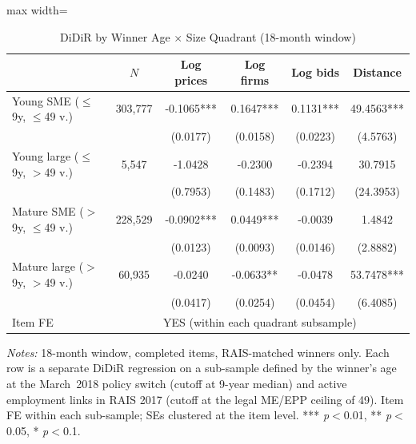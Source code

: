 \begin{table}[htbp]
\centering
\caption{DiDiR by Winner Age $\times$ Size Quadrant (18-month window)}
\label{tab:age_size}
\begin{adjustbox}{max width=\textwidth}
\begin{threeparttable}
\small
\begin{tabular}{lccccc}
\toprule
 & $N$ & Log prices & Log firms & Log bids & Distance \\
\midrule
Young SME ($\leq$9y, $\leq$49 v.) & 303,777 & -0.1065*** & 0.1647*** & 0.1131*** & 49.4563*** \\
 & & (0.0177) & (0.0158) & (0.0223) & (4.5763) \\
Young large ($\leq$9y, $>$49 v.) & 5,547 & -1.0428 & -0.2300 & -0.2394 & 30.7915 \\
 & & (0.7953) & (0.1483) & (0.1712) & (24.3953) \\
Mature SME ($>$9y, $\leq$49 v.) & 228,529 & -0.0902*** & 0.0449*** & -0.0039 & 1.4842 \\
 & & (0.0123) & (0.0093) & (0.0146) & (2.8882) \\
Mature large ($>$9y, $>$49 v.) & 60,935 & -0.0240 & -0.0633** & -0.0478 & 53.7478*** \\
 & & (0.0417) & (0.0254) & (0.0454) & (6.4085) \\
\midrule
Item FE & \multicolumn{5}{c}{YES (within each quadrant subsample)} \\
\bottomrule
\end{tabular}
\begin{tablenotes}
\small
\item \textit{Notes:} 18-month window, completed items, RAIS-matched
winners only. Each row is a separate DiDiR regression on a sub-sample
defined by the winner's age at the March~2018 policy switch (cutoff at
9-year median) and active employment links in RAIS 2017
(cutoff at the legal ME/EPP ceiling of 49).
Item FE within each sub-sample; SEs clustered at the item level.
*** \textit{p}$<$0.01, ** \textit{p}$<$0.05, * \textit{p}$<$0.1.
\end{tablenotes}
\end{threeparttable}
\end{adjustbox}
\end{table}
